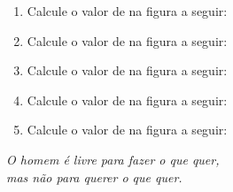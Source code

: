 \documentclass[twocolumn,oneside,a4paper,12pt]{article}
\begin{document}
\pagestyle{empty}
\begin{enumerate}
\item Calcule o valor de  na figura a seguir:

\item Calcule o valor de  na figura a seguir:

\item Calcule o valor de  na figura a seguir:

\item Calcule o valor de  na figura a seguir:

\item Calcule o valor de  na figura a seguir:

\end{enumerate}

\begin{flushright}
\textit{O homem é livre para fazer o que quer,\\mas não para querer o que quer.}
\end{flushright}
\end{document}
